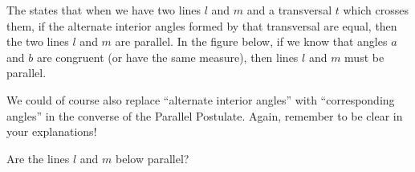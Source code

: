 \documentclass{ximera}
\begin{document}
\begin{definition}
The  states that when we have two lines $l$ and $m$ and a transversal $t$ which crosses them, if the alternate interior angles formed by that transversal are equal, then the two lines $l$ and $m$ are parallel. In the figure below, if we know that angles $a$ and $b$ are congruent (or have the same measure), then lines $l$ and $m$ must be parallel.

\begin{image}
\end{image}

\end{definition}

We could of course also replace ``alternate interior angles'' with ``corresponding angles'' in the converse of the Parallel Postulate. Again, remember to be clear in your explanations!

\begin{question}
Are the lines $l$ and $m$ below parallel?
\begin{image}
\end{image}

\begin{multipleChoice}
\end{multipleChoice}
\end{question}
\end{document}
